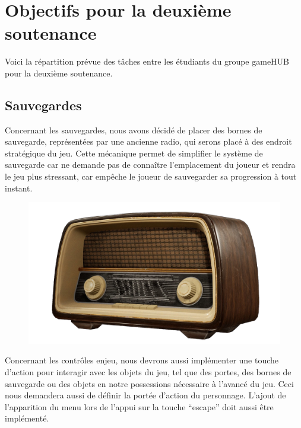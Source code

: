 \section{Objectifs pour la deuxième soutenance}
\noindent Voici la répartition prévue des tâches entre les étudiants du groupe gameHUB pour la deuxième soutenance.

\subsection{Sauvegardes}
\setlength{\parindent}{5ex}
Concernant les sauvegardes, nous avons décidé de placer des bornes de sauvegarde, représentées par une ancienne radio, qui serons placé à des endroit stratégique du jeu. Cette mécanique permet de simplifier le système de sauvegarde car ne demande pas de connaître l’emplacement du joueur et rendra le jeu plus stressant, car empêche le joueur de sauvegarder sa progression à tout instant.
\begin{figure}[H]
\centering
\begin{minipage}{.5\textwidth}
  \centering
  \centerline{\includegraphics[width=1.5\linewidth]{img/assets/save.png}}
  \label{fig:save}
\end{minipage}%
\end{figure}
\newline

Concernant les contrôles enjeu, nous devrons aussi implémenter une touche d’action pour interagir avec les objets du jeu, tel que des portes, des bornes de sauvegarde ou des objets en notre possessions nécessaire à l’avancé du jeu. Ceci nous demandera aussi de définir la portée d’action du personnage.
L'ajout de l'apparition du menu lors de l'appui sur la touche ``escape'' doit aussi être implémenté.
\newline


